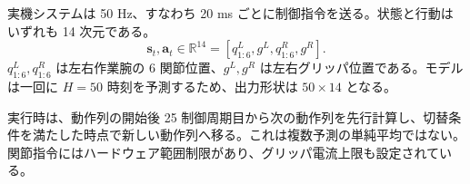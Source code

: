 実機システムは 50 Hz、すなわち 20 ms ごとに制御指令を送る。状態と行動はいずれも 14 次元である。
\[
\mathbf{s}_t,\mathbf{a}_t\in\mathbb{R}^{14}
=[q^L_{1:6},g^L,q^R_{1:6},g^R].
\]
$q^L_{1:6},q^R_{1:6}$ は左右作業腕の 6 関節位置、$g^L,g^R$ は左右グリッパ位置である。モデルは一回に $H=50$ 時刻を予測するため、出力形状は $50\times14$ となる。


実行時は、動作列の開始後 25 制御周期目から次の動作列を先行計算し、切替条件を満たした時点で新しい動作列へ移る。これは複数予測の単純平均ではない。関節指令にはハードウェア範囲制限があり、グリッパ電流上限も設定されている。

